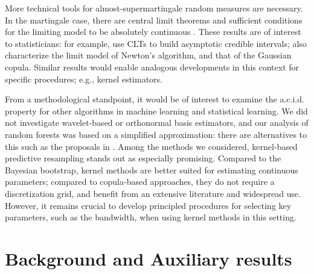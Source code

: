 \documentclass{article}
\theoremstyle{definition}
\renewcommand{\&}{and}
\begin{document}
More technical tools for almost-supermartingale random measures are necessary. In the martingale case, there are central limit theorems \citep{berti2004limit} and sufficient conditions for the limiting model to be absolutely continuous \citep{berti2013exchangeable}. These results are of interest to statisticians: for example, \cite{fortini2020quasi} use CLTs to build asymptotic credible intervals; \cite{fortini2020quasi} also characterize the limit model of Newton’s algorithm, and \cite{fong2021martingale} that of the Gaussian copula. Similar results would enable analogous developments in this context for specific procedures; e.g., kernel estimators.

From a methodological standpoint, it would be of interest to examine the a.c.i.d. property for other algorithms in machine learning and statistical learning. We did not investigate wavelet-based or orthonormal basis estimators, and our analysis of random forests was based on a simplified approximation: there are alternatives to this such as the proposals in \cite{scornet2016random}. Among the methods we considered, kernel-based predictive resampling stands out as especially promising. Compared to the Bayesian bootstrap, kernel methods are better suited for estimating continuous parameters; compared to copula-based approaches, they do not require a discretization grid, and benefit from an extensive literature and widespread use. However, it remains crucial to develop principled procedures for selecting key parameters, such as the bandwidth, when using kernel methods in this setting.











\newpage
\appendix



\section{Background and Auxiliary results}
\end{document}
